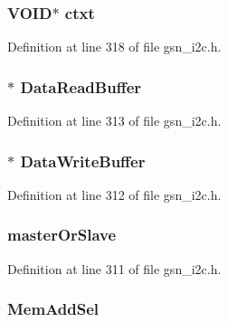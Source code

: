 \hypertarget{a00098_ae62f152f1a2f6e8ecad552f10d250166}{
\subsubsection[{ctxt}]{\setlength{\rightskip}{0pt plus 5cm}VOID$\ast$ {\bf ctxt}}}
\label{a00098_ae62f152f1a2f6e8ecad552f10d250166}


Definition at line 318 of file gsn\_\-i2c.h.

\hypertarget{a00098_ac7efaea2646c7c874764140d2c15894e}{
\subsubsection[{DataReadBuffer}]{$\ast$ {\bf DataReadBuffer}}}
\label{a00098_ac7efaea2646c7c874764140d2c15894e}


Definition at line 313 of file gsn\_\-i2c.h.

\hypertarget{a00098_a8f9a58f073e6e06f613db1a7c471ed1a}{
\subsubsection[{DataWriteBuffer}]{$\ast$ {\bf DataWriteBuffer}}}
\label{a00098_a8f9a58f073e6e06f613db1a7c471ed1a}


Definition at line 312 of file gsn\_\-i2c.h.

\hypertarget{a00098_ab6c0e135c554375f2356d63427904425}{
\subsubsection[{masterOrSlave}]{ {\bf masterOrSlave}}}
\label{a00098_ab6c0e135c554375f2356d63427904425}


Definition at line 311 of file gsn\_\-i2c.h.

\hypertarget{a00098_ae558380c5e3a7dceede8655866dceb63}{
\subsubsection[{MemAddSel}]{ {\bf MemAddSel}}}
\label{a00098_ae558380c5e3a7dceede8655866dceb63}


